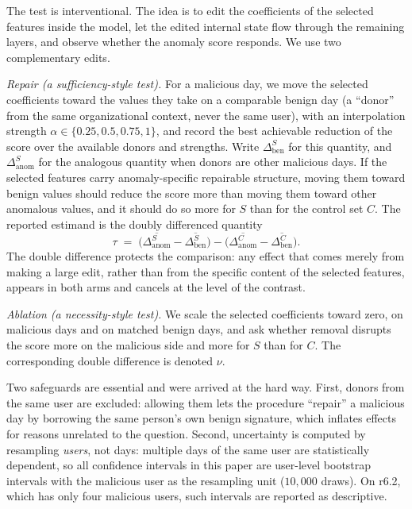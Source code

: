 \documentclass[10pt]{article}
\begin{document}
The test is interventional. The idea is to edit the coefficients of the
selected features inside the model, let the edited internal state flow
through the remaining layers, and observe whether the anomaly score
responds. We use two complementary edits.

\emph{Repair (a sufficiency-style test).} For a malicious day, we move
the selected coefficients toward the values they take on a comparable
benign day (a ``donor'' from the same organizational context, never the
same user), with an interpolation strength
$\alpha \in \{0.25, 0.5, 0.75, 1\}$, and record the best achievable
reduction of the score over the available donors and strengths. Write
$\Delta^{S}_{\mathrm{ben}}$ for this quantity, and
$\Delta^{S}_{\mathrm{anom}}$ for the analogous quantity when donors are
other malicious days. If the selected features carry anomaly-specific
repairable structure, moving them toward benign values should reduce
the score more than moving them toward other anomalous values, and it
should do so more for $S$ than for the control set $C$. The reported
estimand is the doubly differenced quantity
\begin{equation}
\tau \;=\; \bigl(\overline{\Delta^{S}_{\mathrm{anom}}} -
\overline{\Delta^{S}_{\mathrm{ben}}}\bigr) -
\bigl(\overline{\Delta^{C}_{\mathrm{anom}}} -
\overline{\Delta^{C}_{\mathrm{ben}}}\bigr).
\end{equation}
The double difference protects the comparison: any effect that comes
merely from making a large edit, rather than from the specific content
of the selected features, appears in both arms and cancels at the level
of the contrast.

\emph{Ablation (a necessity-style test).} We scale the selected
coefficients toward zero, on malicious days and on matched benign days,
and ask whether removal disrupts the score more on the malicious side
and more for $S$ than for $C$. The corresponding double difference is
denoted $\nu$.

Two safeguards are essential and were arrived at the hard way. First,
donors from the same user are excluded: allowing them lets the
procedure ``repair'' a malicious day by borrowing the same person's own
benign signature, which inflates effects for reasons unrelated to the
question. Second, uncertainty is computed by resampling \emph{users},
not days: multiple days of the same user are statistically dependent,
so all confidence intervals in this paper are user-level bootstrap
intervals with the malicious user as the resampling unit ($10{,}000$
draws). On r6.2, which has only four malicious users, such intervals
are reported as descriptive.
\end{document}
